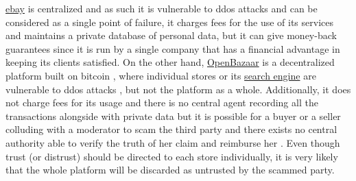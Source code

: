      \href{http://www.ebay.com}{ebay} is
     centralized and as such it is vulnerable to ddos attacks \cite{ddosattacks} and can be considered as a single point of
     failure, it charges fees for the use of its services \cite{ebayfees} and maintains a private database of personal data,
     but it can give money-back guarantees \cite{ebayguarantee} since it is run by a single company that has a financial
     advantage in keeping its clients satisfied. On the other hand, \href{https://openbazaar.org/}{OpenBazaar} is a
     decentralized platform built on bitcoin \cite{bitcoin}, where individual stores or its \href{https://duosear.ch}{search
     engine} are vulnerable to ddos attacks \cite{ddosattacks}, but not the platform as a whole. Additionally, it does not
     charge fees for its usage \cite{openbazaar} and there is no central agent recording all the transactions alongside with
     private data \cite{openbazaar} but it is possible for a buyer or a seller colluding with a  moderator to scam the third
     party and there exists no central authority able to verify the truth of her claim and reimburse her
     \cite{multisigfraud}. Even though trust (or distrust) should be directed to each store individually, it is very likely
     that the whole platform will be discarded as untrusted by the scammed party.

